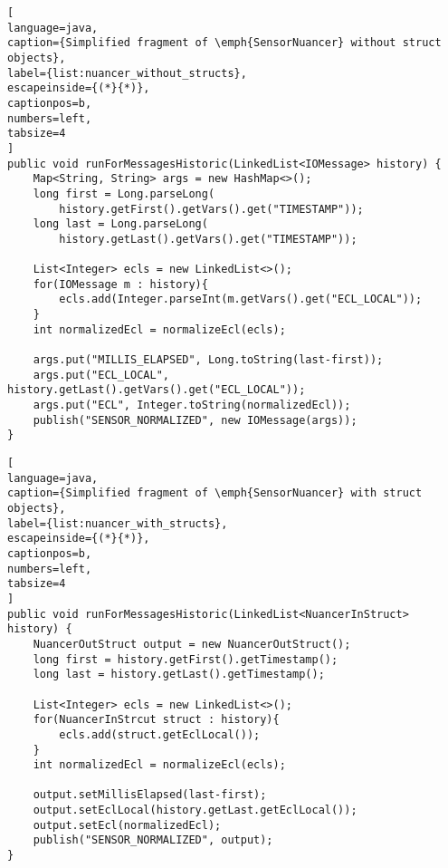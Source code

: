 \begin{scriptsize}
\begin{lstlisting}[
language=java, 
caption={Simplified fragment of \emph{SensorNuancer} without struct objects}, 
label={list:nuancer_without_structs}, 
escapeinside={(*}{*)}, 
captionpos=b,
numbers=left,
tabsize=4
]
public void runForMessagesHistoric(LinkedList<IOMessage> history) {
	Map<String, String> args = new HashMap<>();
	long first = Long.parseLong(
		history.getFirst().getVars().get("TIMESTAMP"));
	long last = Long.parseLong(
		history.getLast().getVars().get("TIMESTAMP"));
			
	List<Integer> ecls = new LinkedList<>();
	for(IOMessage m : history){
		ecls.add(Integer.parseInt(m.getVars().get("ECL_LOCAL"));		
	}
	int normalizedEcl = normalizeEcl(ecls);
			
	args.put("MILLIS_ELAPSED", Long.toString(last-first));
	args.put("ECL_LOCAL", history.getLast().getVars().get("ECL_LOCAL"));
	args.put("ECL", Integer.toString(normalizedEcl));
	publish("SENSOR_NORMALIZED", new IOMessage(args));		
}
\end{lstlisting}
\begin{lstlisting}[
language=java, 
caption={Simplified fragment of \emph{SensorNuancer} with struct objects}, 
label={list:nuancer_with_structs}, 
escapeinside={(*}{*)}, 
captionpos=b,
numbers=left,
tabsize=4
]	
public void runForMessagesHistoric(LinkedList<NuancerInStruct> history) {
	NuancerOutStruct output = new NuancerOutStruct();
	long first = history.getFirst().getTimestamp();
	long last = history.getLast().getTimestamp();
			
	List<Integer> ecls = new LinkedList<>();
	for(NuancerInStrcut struct : history){
		ecls.add(struct.getEclLocal());
	}
	int normalizedEcl = normalizeEcl(ecls);		
			
	output.setMillisElapsed(last-first);
	output.setEclLocal(history.getLast.getEclLocal());
	output.setEcl(normalizedEcl);				
	publish("SENSOR_NORMALIZED", output);	
}
\end{lstlisting}
\end{scriptsize}